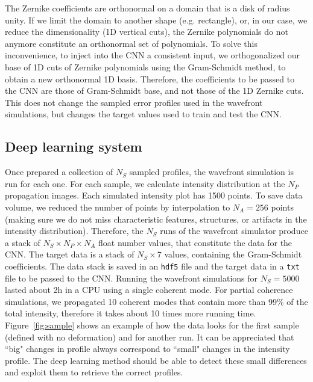 \documentclass[preprint]{iucr}
\newcommand{\inred}[1]{{\color{red}#1}}
\begin{document}
The Zernike coefficients are orthonormal on a domain that is a disk of radius unity. If we limit the domain to another shape (e.g. rectangle), or, in our case, we reduce the dimensionality (1D vertical cuts), the Zernike polynomials do not anymore constitute an orthonormal set of polynomials. To solve this inconvenience, to inject into the CNN a consistent input, we orthogonalized our base of 1D cuts of Zernike polynomials using the Gram-Schmidt method, to obtain a new orthonormal 1D basis. Therefore, the coefficients to be passed to the CNN are those of Gram-Schmidt base, and not those of the 1D Zernike cuts. This does not change the sampled error profiles used in the wavefront simulations, but changes the target values used to train and test the CNN.  

\subsection{Deep learning system}

Once prepared a collection of $N_S$ sampled profiles, the wavefront simulation is run for each one. For each sample,  we calculate intensity distribution at the $N_P$ propagation images. Each simulated intensity plot has 1500 points. To save data volume, we reduced the number of points by interpolation to $N_A=256$ points (making sure we do not miss characteristic features, structures, or artifacts in the intensity distribution). Therefore, the $N_S$ runs of the wavefront simulator produce a stack of $N_S \times N_P \times N_A$ float number values, that constitute the data for the CNN. The target data is a stack of $N_S \times 7$ values, containing the Gram-Schmidt coefficients. The data stack is saved in an \texttt{hdf5} file and the target data in a \texttt{txt} file to be passed to the CNN. Running the wavefront simulations for $N_S=5000$ lasted about 2h in a CPU using a single coherent mode. For partial coherence simulations, we propagated 10 coherent modes that contain more than 99\% of the total intensity, therefore it takes about 10 times more running time. Figure~\ref{fig:sample} shows an example of how the data looks for the first sample (defined with no deformation) and for another run. \inred{It can be appreciated that ``big" changes in profile always correspond to ``small" changes in the intensity profile. The deep learning method should be able to detect these small differences and exploit them to retrieve the correct profiles. }
\end{document}
